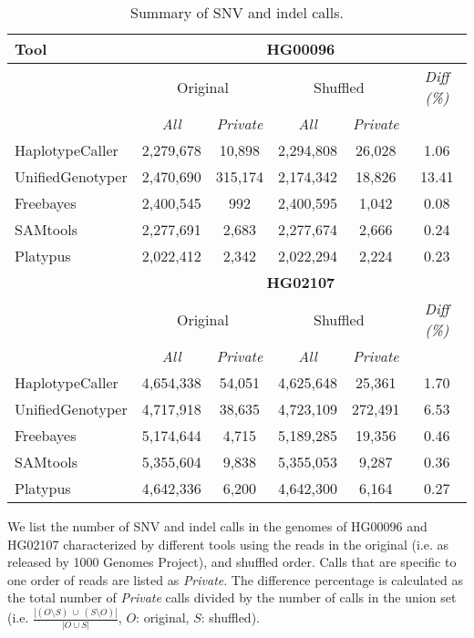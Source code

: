\documentclass[10pt,a4paper]{article}
\begin{document}
\begin{table}[htb]
\caption{Summary of SNV and indel calls.}
\begin{center}
\begin{tabular}{|l|c|c||c|c||c|}
\hline
{\bf Tool} & \multicolumn{5}{|c|}{\bf HG00096} \\
\hline
{\bf } & \multicolumn{2}{c||}{Original} & \multicolumn{2}{c||}{Shuffled} & {\it Diff (\%) }\\
\cline{2-6}
{\bf } & {\it All } & {\it Private } & {\it All } & {\it Private } & {\it } \\
\hline
HaplotypeCaller & 2,279,678 & 10,898 & 2,294,808 & 26,028 & 1.06 \\
UnifiedGenotyper & 2,470,690 & 315,174 & 2,174,342 & 18,826 & 13.41 \\
Freebayes & 2,400,545 & 992 & 2,400,595 & 1,042 & 0.08 \\
SAMtools & 2,277,691 & 2,683 & 2,277,674 & 2,666 & 0.24 \\
Platypus & 2,022,412 & 2,342 & 2,022,294 & 2,224 & 0.23 \\
\hline
\hline
{\bf } & \multicolumn{5}{|c|}{\bf HG02107} \\
\hline
{\bf } & \multicolumn{2}{c||}{Original} & \multicolumn{2}{c||}{Shuffled} & {\it Diff (\%) }\\
\cline{2-6}
{\bf } & {\it All } & {\it Private } & {\it All } & {\it Private } & {\it } \\
\hline
HaplotypeCaller & 4,654,338 & 54,051 & 4,625,648 & 25,361 & 1.70 \\
UnifiedGenotyper & 4,717,918 & 38,635 & 4,723,109 & 272,491 & 6.53 \\
Freebayes & 5,174,644 & 4,715 & 5,189,285 & 19,356 & 0.46 \\
SAMtools & 5,355,604 & 9,838 & 5,355,053 & 9,287 & 0.36 \\
Platypus & 4,642,336 & 6,200 & 4,642,300 & 6,164 & 0.27 \\
\hline
\end{tabular}
\end{center}
{\footnotesize We list the number of SNV and indel calls in the genomes of HG00096 and HG02107 characterized by different tools using the reads in the original (i.e. as released by 1000 Genomes Project), and shuffled order.
Calls that are specific to one order of reads are listed as {\it Private}.
 The difference percentage is calculated as the total number of {\it Private} calls divided by the number of calls in the union set  (i.e. $\frac{|(O\setminus S)~\cup~ (S\setminus O)|}{|O\cup S|}$, $O$: original, $S$: shuffled). }
\label{tab:snps-orig-vs-shuf}
\end{table}
\end{document}
